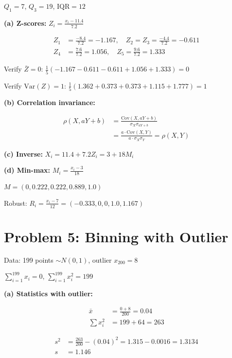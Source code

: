 \documentclass[10pt,twocolumn]{article}
\begin{document}
\(Q_1 = 7\), \(Q_3 = 19\), \(\text{IQR} = 12\)

\textbf{(a) Z-scores:} \(Z_i = \frac{x_i - 11.4}{7.2}\)

\begin{align*}
Z_1 &= \frac{-8.4}{7.2} = -1.167, \quad Z_2 = Z_3 = \frac{-4.4}{7.2} = -0.611 \\
Z_4 &= \frac{7.6}{7.2} = 1.056, \quad Z_5 = \frac{9.6}{7.2} = 1.333
\end{align*}

Verify \(\bar{Z} = 0\):
\(\frac{1}{5}(-1.167 - 0.611 - 0.611 + 1.056 + 1.333) = 0\)

Verify \(\text{Var}(Z) = 1\):
\(\frac{1}{5}(1.362 + 0.373 + 0.373 + 1.115 + 1.777) = 1\)

\textbf{(b) Correlation invariance:}

\begin{align*}
\rho(X, aY+b) &= \frac{\text{Cov}(X, aY+b)}{\sigma_X \sigma_{aY+b}} \\
&= \frac{a \cdot \text{Cov}(X,Y)}{a \cdot \sigma_X \sigma_Y} = \rho(X,Y)
\end{align*}

\textbf{(c) Inverse:} \(X_i = 11.4 + 7.2Z_i = 3 + 18M_i\)

\textbf{(d) Min-max:} \(M_i = \frac{x_i - 3}{18}\)

\(M = (0, 0.222, 0.222, 0.889, 1.0)\)

Robust: \(R_i = \frac{x_i - 7}{12} = (-0.333, 0, 0, 1.0, 1.167)\)

\section*{Problem 5: Binning with Outlier}

Data: 199 points \(\sim N(0,1)\), outlier \(x_{200}=8\)

\(\sum_{i=1}^{199} x_i = 0\), \(\sum_{i=1}^{199} x_i^2 = 199\)

\textbf{(a) Statistics with outlier:}

\begin{align*}
\bar{x} &= \frac{0 + 8}{200} = 0.04 \\
\sum x_i^2 &= 199 + 64 = 263
\end{align*}

\begin{align*}
s^2 &= \frac{263}{200} - (0.04)^2 = 1.315 - 0.0016 = 1.3134 \\
s &= 1.146
\end{align*}
\end{document}
